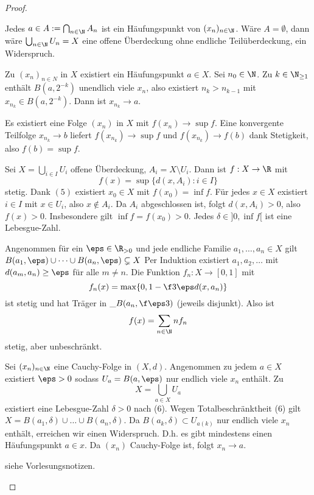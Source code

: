 \begin{st}
\begin{proof}
\begin{seg}[$(2) \implies (3)$]
			Jedes $a \in A := \bigcap_{n\in \N} A_n$ ist ein Häufungspunkt von $(x_n)_{n\in\N}$.
			Wäre $A = \emptyset$, dann wäre $\bigcup_{n \in \N} U_n = X$ eine offene Überdeckung ohne endliche Teilüberdeckung, ein Widerspruch.
		\end{seg}
		\begin{seg}[$(3) \implies (4)$]
			Zu $(x_n)_{n\in N}$ in $X$ existiert ein Häufungspunkt $a \in X$.
			Sei $n_0 \in \N$.
			Zu $k \in \N_{\ge 1}$ enthält $B(a, 2^{-k})$ unendlich viele $x_n$, also existiert $n_k > n_{k-1}$ mit $x_{n_k} \in B(a,2^{-k})$.
			Dann ist $x_{n_k} \to a$.
		\end{seg}
		\begin{seg}[$(4) \implies (5)$]
			Es existiert eine Folge $(x_n)$ in $X$ mit $f(x_n) \to \sup f$.
			Eine konvergente Teilfolge $x_{n_k} \to b$ liefert $f(x_{n_k}) \to \sup f$ und $f(x_{n_k}) \to f(b)$ dank Stetigkeit, also $f(b) = \sup f$.
		\end{seg}
		\begin{seg}[$(5) \implies (6)$]
			Sei $X = \bigcup_{i \in I} U_i$ offene Überdeckung, $A_i = X \setminus U_i$.
			Dann ist $f: X \to \R$ mit
			\[
				f(x) = \sup \{ d(x, A_i) : i \in I \}
			\]
			stetig.
			Dank $(5)$ existiert $x_0 \in X$ mit $f(x_0) = \inf f$.
			Für jedes $x \in X$ existiert $i \in I$ mit $x \in U_i$, also $x \not\in A_i$.
			Da $A_i$ abgeschlossen ist, folgt $d(x,A_i) > 0$, also $f(x) > 0$.
			Insbesondere gilt $\inf f = f(x_0) > 0$.
			Jedes $\delta \in ]0, \inf f[$ ist eine Lebesgue-Zahl.

			Angenommen für ein $\eps \in \R_{>0}$ und jede endliche Familie $a_1, \dotsc, a_n \in X$ gilt $B(a_1,\eps) \cup \dotsb \cup B(a_n,\eps) \subsetneq X$
			Per Induktion existiert $a_1, a_2, \dotsc$ mit $d(a_m,a_n) \ge \eps$ für alle $m \neq n$.
			Die Funktion $f_n : X \to [0,1]$ mit
			\[
				f_n(x) = \max \{ 0, 1 - \f 3\eps d(x,a_n) \}
			\]
			ist stetig und hat Träger in $\_B(a_n, \f \eps3)$ (jeweils disjunkt).
			Also ist
			\[
				f(x) = \sum_{n\in \N} n f_n
			\]
			stetig, aber unbeschränkt.
		\end{seg}
		\begin{seg}[$(6) \implies (7)$]
			Sei $(x_n)_{n \in \N}$ eine Cauchy-Folge in $(X,d)$.
			Angenommen zu jedem $a \in X$ existiert $\eps > 0$ sodass $U_a = B(a, \eps)$ nur endlich viele $x_n$ enthält.
			Zu
			\[
				X = \bigcup_{a \in X} U_a
			\]
			existiert eine Lebesgue-Zahl $\delta > 0$ nach (6).
			Wegen Totalbeschränktheit (6) gilt $X = B(a_1, \delta) \cup \dotsc \cup B(a_n,\delta)$.
			Da $B(a_k,\delta) \subset U_{a(k)}$ nur endlich viele $x_n$ enthält, erreichen wir einen Widerspruch.
			D.h. es gibt mindestens einen Häufungspunkt $a \in x$.
			Da $(x_n)$ Cauchy-Folge ist, folgt $x_n \to a$.
		\end{seg}
		\begin{seg}
			siehe Vorlesungsnotizen.
		\end{seg}
	\end{proof}
\end{st}

